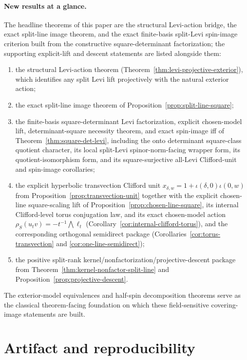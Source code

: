 \documentclass[11pt,a4paper]{article}
\theoremstyle{plain}
\theoremstyle{definition}
\theoremstyle{remark}
\begin{document}
\paragraph{New results at a glance.}
The headline theorems of this paper are the structural Levi-action bridge,
the exact split-line image theorem, and the exact finite-basis split-Levi
spin-image criterion built from the constructive square-determinant
factorization; the supporting explicit-lift and descent statements are listed
alongside them:
\begin{enumerate}
\item the structural Levi-action theorem
  (Theorem~\ref{thm:levi-projective-exterior}), which identifies any split Levi
  lift projectively with the natural exterior action;
\item the exact split-line image theorem of
  Proposition~\ref{prop:split-line-square};
\item the finite-basis square-determinant Levi factorization, explicit
  chosen-model lift, determinant-square necessity theorem, and exact spin-image
  iff of Theorem~\ref{thm:square-det-levi}, including the onto determinant
  square-class quotient character, its local split-Levi spinor-norm-facing
  wrapper form, its quotient-isomorphism form, and its square-surjective all-Levi
  Clifford-unit and spin-image corollaries;
\item the explicit hyperbolic transvection Clifford unit
  $x_{\delta,w}=1+\iota(\delta,0)\iota(0,w)$ from
  Proposition~\ref{prop:transvection-unit} together with the explicit chosen-line
  square-scaling lift of Proposition~\ref{prop:chosen-line-square}, its internal
  Clifford-level torus conjugation law, and its exact chosen-model action
  $\rho_S(u_t v)=-t^{-1}\bigwedge \ell_t$
  (Corollary~\ref{cor:internal-clifford-torus}), and the corresponding
  orthogonal semidirect package
  (Corollaries~\ref{cor:torus-transvection} and
  \ref{cor:one-line-semidirect});
\item the positive split-rank kernel/nonfactorization/projective-descent package
  from Theorem~\ref{thm:kernel-nonfactor-split-line} and
  Proposition~\ref{prop:projective-descent}.
\end{enumerate}
The exterior-model equivalences and half-spin decomposition theorems serve as
the classical theorem-facing foundation on which these field-sensitive
covering-image statements are built.

\section{Artifact and reproducibility}
\label{sec:artifact}
\end{document}
